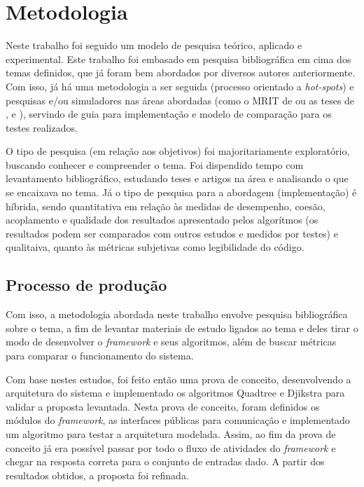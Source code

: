 \chapter[Metodologia]{Metodologia}

Neste trabalho foi seguido um modelo de pesquisa teórico, aplicado e experimental. Este trabalho foi embasado em pesquisa bibliográfica em cima dos temas definidos, que já foram bem abordados por diversos autores anteriormente. Com isso, já há uma metodologia a ser seguida (processo orientado a \textit{hot-spots}) e pesquisas e/ou simuladores nas áreas abordadas (como o MRIT de \cite{Guzman2008} ou as teses de \cite{Souza2008}, \cite{Thomsen2010} e \cite{Strandberg2004}), servindo de guia para implementação e modelo de comparação para os testes realizados.

O tipo de pesquisa (em relação aos objetivos) foi majoritariamente exploratório, buscando conhecer e compreender o tema. Foi dispendido tempo com levantamento bibliográfico, estudando teses e artigos na área e analisando o que se encaixava no tema. Já o tipo de pesquisa para a abordagem (implementação) é híbrida, sendo quantitativa em relação às medidas de desempenho, coesão, acoplamento e qualidade dos resultados apresentado pelos algorítmos (os resultados podem ser comparados com outros estudos e medidos por testes) e qualitaiva, quanto às métricas subjetivas como legibilidade do código.

\section{Processo de produção}

Com isso, a metodologia abordada neste trabalho envolve pesquisa bibliográfica sobre o tema, a fim de levantar materiais de estudo ligados ao tema e deles tirar o modo de desenvolver o \textit{framework} e seus algoritmos, além de buscar métricas para comparar o funcionamento do sistema. 

Com base nestes estudos, foi feito então uma prova de conceito, desenvolvendo a arquitetura do sistema e implementado os algoritmos Quadtree e Djikstra para validar a proposta levantada. Nesta prova de conceito, foram definidos os módulos do \textit{framework}, as interfaces públicas para comunicação e implementado um algoritmo para testar a arquitetura modelada. Assim, ao fim da prova de conceito já era possível passar por todo o fluxo de atividades do \textit{framework} e chegar na resposta correta para o conjunto de entradas dado. A partir dos resultados obtidos, a proposta foi refinada.

